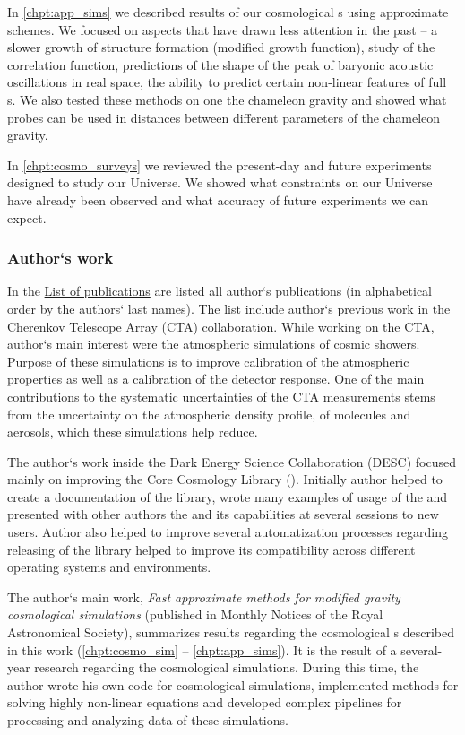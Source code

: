 In \autoref{chpt:app_sims} we described results of our cosmological \nbodysim s using approximate schemes. We focused on aspects that have drawn less attention in the past -- a slower growth of structure formation (modified growth function), study of the correlation function, predictions of the shape of the peak of baryonic acoustic oscillations in real space, the ability to predict certain non-linear features of full \nbody s. We also tested these methods on one the chameleon gravity and showed what probes can be used in distances between different parameters of the chameleon gravity.

In \autoref{chpt:cosmo_surveys} we reviewed the present-day and future experiments designed to study our Universe. We showed what constraints on our Universe have already been observed and what accuracy of future experiments we can expect.

\subsubsection{Author`s work}
In the \hyperref[chpt:list_publish]{List of publications} are listed all author`s publications (in alphabetical order by the authors` last names). The list include author`s previous work in the Cherenkov Telescope Array (CTA) collaboration. While working on the CTA, author`s main interest were the atmospheric simulations of cosmic showers. Purpose of these simulations is to improve calibration of the atmospheric properties as well as a calibration of the detector response. One of the main contributions to the systematic uncertainties of the CTA measurements stems from the uncertainty on the atmospheric density profile, of molecules and aerosols, which these simulations help reduce.

The author`s work inside the Dark Energy Science Collaboration (DESC) focused mainly on improving the Core Cosmology Library (). Initially author helped to create a documentation of the library, wrote many examples of usage of the  and presented with other authors the  and its capabilities at several sessions to new users. Author also helped to improve several automatization processes regarding releasing of the library helped to improve its compatibility across different operating systems and environments.

The author`s main work, \textit{Fast approximate methods for modified gravity cosmological simulations} (published in Monthly Notices of the Royal Astronomical Society), summarizes results regarding the cosmological \nbodysim s described in this work (\autoref{chpt:cosmo_sim} -- \autoref{chpt:app_sims}). It is the result of a several-year research regarding the cosmological simulations. During this time, the author wrote his own code for cosmological simulations, implemented methods for solving highly non-linear equations and developed complex pipelines for processing and analyzing data of these simulations.
